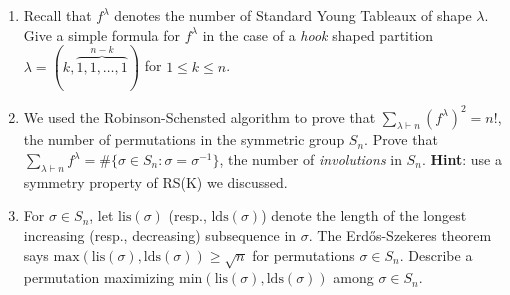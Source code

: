 \documentclass[11pt]{article}
\begin{document}
\begin{enumerate}
\item Recall that $f^{\lambda}$ denotes the number of Standard Young Tableaux of shape $\lambda$. Give a simple formula for $f^{\lambda}$ in the case of a \emph{hook} shaped partition $\lambda = (k,\overbrace{1,1,\ldots,1}^{n-k})$ for $1\leq k \leq n$. 

\item We used the Robinson-Schensted algorithm to prove that $\sum_{\lambda \vdash n} (f^{\lambda})^2 = n!$, the number of permutations in the symmetric group $S_n$. Prove that $\sum_{\lambda \vdash n} f^{\lambda} = \#\{\sigma \in S_n \colon \sigma=\sigma^{-1}\}$, the number of \emph{involutions} in $S_n$. {\bf Hint}: use a symmetry property of RS(K) we discussed.

\item For $\sigma\in S_n$, let $\mathrm{lis}(\sigma)$ (resp., $\mathrm{lds}(\sigma)$) denote the length of the longest increasing (resp., decreasing) subsequence in $\sigma$. The Erd\H{o}s-Szekeres theorem says $\mathrm{max}(\mathrm{lis}(\sigma), \mathrm{lds}(\sigma)) \geq \sqrt{n}$ for permutations $\sigma\in S_n$. Describe a permutation maximizing $\mathrm{min}(\mathrm{lis}(\sigma), \mathrm{lds}(\sigma))$ among  $\sigma \in S_n$.

\end{enumerate}
\end{document}

